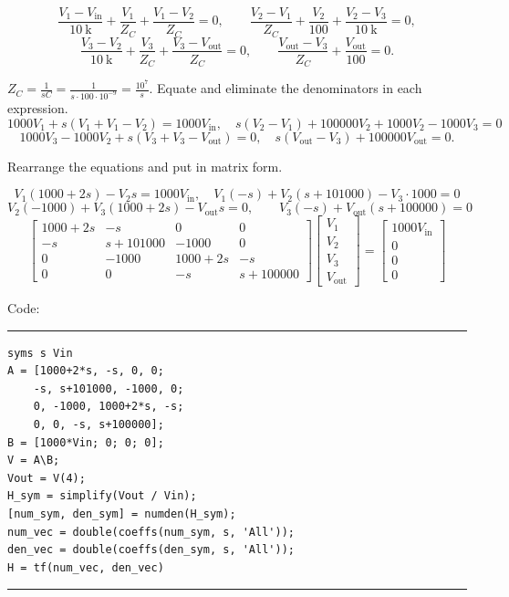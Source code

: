 \documentclass[11pt]{article}
\begin{document}
\begin{enumerate}[leftmargin=*,label=\textbf{\arabic*.}]
\begin{enumerate}[leftmargin=*,label=\textbf{\theenumi\arabic*.}]
\[\frac{V_1-V_\text{in}}{10~\text{k}}+\frac{V_1}{Z_C}+\frac{V_1-V_2}{Z_C}=0,\qquad\frac{V_2-V_1}{Z_C}+\frac{V_2}{100}+\frac{V_2-V_3}{10~\text{k}}=0,\]
\[\frac{V_3-V_2}{10~\text{k}}+\frac{V_3}{Z_C}+\frac{V_3-V_\text{out}}{Z_C}=0,\qquad\frac{V_\text{out}-V_3}{Z_C}+\frac{V_\text{out}}{100}=0.\]

$Z_C=\frac1{sC}=\frac1{s\cdot100\cdot10^{-9}}=\frac{10^7}s$. Equate and eliminate the denominators in each expression.
\[1000V_1+s(V_1+V_1-V_2)=1000V_\text{in},\quad s(V_2-V_1)+100000V_2+1000V_2-1000V_3=0\]
\[1000V_3-1000V_2+s(V_3+V_3-V_\text{out})=0,\quad s(V_\text{out}-V_3)+100000V_\text{out}=0.\]


Rearrange the equations and put in matrix form.

\[V_1(1000+2s)-V_2s=1000V_\text{in},\quad V_1(-s)+V_2(s+101000)-V_3\cdot1000=0\]
\[V_2(-1000)+V_3\left(1000+2s\right)-V_\text{out}s=0,\qquad V_3(-s)+V_\text{out}(s+100000)=0\]
\[\begin{bmatrix}
1000 + 2s & -s & 0 & 0 \\
-s & s + 101000 & -1000 & 0 \\
0 & -1000 & 1000 + 2s & -s \\
0 & 0 & -s & s + 100000
\end{bmatrix}
\begin{bmatrix}
V_1 \\
V_2 \\
V_3 \\
V_{\text{out}}
\end{bmatrix}
=
\begin{bmatrix}
1000V_{\text{in}} \\
0 \\
0 \\
0
\end{bmatrix}\]

Code:
\vspace{1em}

\hrule
\begin{verbatim}
syms s Vin
A = [1000+2*s, -s, 0, 0;
    -s, s+101000, -1000, 0;
    0, -1000, 1000+2*s, -s;
    0, 0, -s, s+100000];
B = [1000*Vin; 0; 0; 0];
V = A\B;
Vout = V(4);
H_sym = simplify(Vout / Vin);
[num_sym, den_sym] = numden(H_sym);
num_vec = double(coeffs(num_sym, s, 'All'));
den_vec = double(coeffs(den_sym, s, 'All'));
H = tf(num_vec, den_vec)
\end{verbatim}
\hrule


\end{enumerate}
\end{enumerate}
\end{document}
